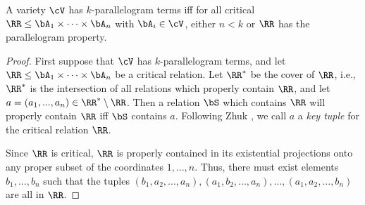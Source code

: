 \begin{thm}\label{parallelogram-critical} A variety $\cV$ has $k$-parallelogram terms iff for all critical $\RR \le \bA_1 \times \cdots \times \bA_n$ with $\bA_i \in \cV$, either $n < k$ or $\RR$ has the parallelogram property.
\end{thm}
\begin{proof} First suppose that $\cV$ has $k$-parallelogram terms, and let $\RR \le \bA_1 \times \cdots \times \bA_n$ be a critical relation. Let $\RR^*$ be the cover of $\RR$, i.e., $\RR^*$ is the intersection of all relations which properly contain $\RR$, and let $a = (a_1, ..., a_n) \in \RR^*\setminus \RR$. Then a relation $\bS$ which contains $\RR$ will properly contain $\RR$ iff $\bS$ contains $a$. Following Zhuk \cite{zhuk-key}, we call $a$ a \emph{key tuple} for the critical relation $\RR$.

Since $\RR$ is critical, $\RR$ is properly contained in its existential projections onto any proper subset of the coordinates $1, ..., n$. Thus, there must exist elements $b_1, ..., b_n$ such that the tuples $(b_1,a_2,...,a_n), (a_1,b_2,...,a_n), ..., (a_1, a_2, ..., b_n)$ are all in $\RR$.


\end{proof}
